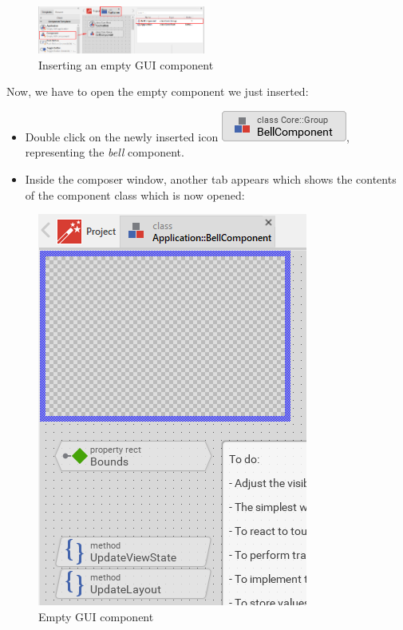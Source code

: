 \documentclass[
  a4paper,
,tablecaptionabove
]{scrbook}
\begin{document}
\begin{figure}
\centering
\includegraphics[keepaspectratio,width=5.5cm]{./../asciidoc/modules/ROOT/assets/images/firstcomponent/InsertingComponent.png}
\caption{Inserting an empty GUI component}
\end{figure}

Now, we have to open the empty component we just inserted:

\begin{itemize}
\item
  Double click on the newly inserted icon
  \includegraphics{./../asciidoc/modules/ROOT/assets/images/icons/BellComponentIcon.png},
  representing the \emph{bell} component.
\item
  Inside the composer window, another tab appears which shows the
  contents of the component class which is now opened:
\end{itemize}

\begin{figure}
\centering
\includegraphics{./../asciidoc/modules/ROOT/assets/images/firstcomponent/EmptyComponent.png}
\caption{Empty GUI component}
\end{figure}
\end{document}
